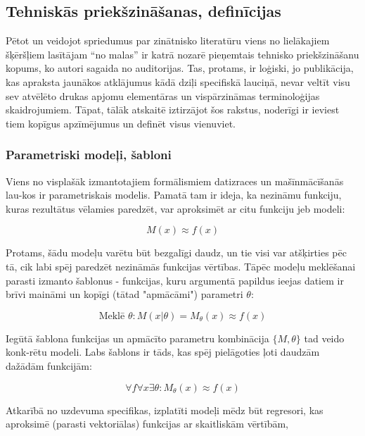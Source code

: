 \documentclass[12pt, a4paper]{article}
\numberwithin{equation}{section} %
\begin{document}
\subsection{Tehniskās priekšzināšanas, definīcijas}

Pētot un veidojot spriedumus par zinātnisko literatūru viens no lielākajiem šķēršļiem lasītājam ``no malas'' ir katrā nozarē pieņemtais tehnisko priekšzināšanu kopums, ko autori sagaida no auditorijas. Tas, protams, ir loģiski, jo publikācija, kas apraksta jaunākos atklājumus kādā dziļi specifiskā lauciņā, nevar veltīt visu sev atvēlēto drukas apjomu elementāras un vispārzināmas terminoloģijas skaidrojumiem. Tāpat, tālāk atskaitē iztirzājot šos rakstus, noderīgi ir ieviest tiem kopīgus apzīmējumus un definēt visus vienuviet.

\subsubsection{Parametriski modeļi, šabloni}

Viens no visplašāk izmantotajiem formālismiem datizraces un mašīnmācīšanās lau-kos ir parametriskais modelis. Pamatā tam ir ideja, ka nezināmu funkciju, kuras rezultātus vēlamies paredzēt, var aproksimēt ar citu funkciju jeb modeli:

\begin{equation} 
    M(x) \approx f(x)
\end{equation}

Protams, šādu modeļu varētu būt bezgalīgi daudz, un tie visi var atšķirties pēc tā, cik labi spēj paredzēt nezināmās funkcijas vērtības. Tāpēc modeļu meklēšanai parasti izmanto šablonus - funkcijas, kuru argumentā papildus ieejas datiem ir brīvi maināmi un kopīgi (tātad "apmācāmi") parametri $\theta$:

\begin{equation} 
    \text{Meklē } \theta:M(x \vert \theta) = M_{\theta}(x)  \approx f(x)
\end{equation}

Iegūtā šablona funkcijas un apmācīto parametru kombinācija $\lbrace M, \theta \rbrace$ tad veido konk-rētu modeli. Labs šablons ir tāds, kas spēj pielāgoties ļoti daudzām dažādām funkcijām:

\begin{equation} 
    \forall f \forall x \exists \theta:M_{\theta}(x)\approx f(x)
\end{equation}

Atkarībā no uzdevuma specifikas, izplatīti modeļi mēdz būt regresori, kas aproksimē (parasti vektoriālas) funkcijas ar skaitliskām vērtībām,
\end{document}
